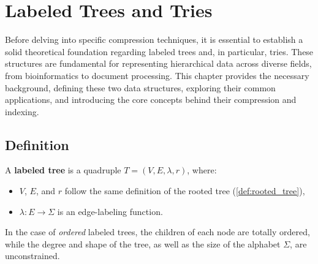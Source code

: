 \section{Labeled Trees and Tries} \label{chp:thbg_labeled_tree}
Before delving into specific compression techniques, it is essential to establish a solid theoretical foundation regarding labeled trees and, in particular, tries.
These structures are fundamental for representing hierarchical data across diverse fields, from bioinformatics to document processing.
This chapter provides the necessary background, defining these two data structures, exploring their common applications, and introducing the core concepts behind their compression and indexing. 

\subsection{Definition}
\begin{definition} \label{def:labeled_tree}
    A \textbf{labeled tree} is a quadruple $T = (V, E, \lambda, r)$, where:
    \begin{itemize}
        \item $V$, $E$, and $r$ follow the same definition of the rooted tree (\cref{def:rooted_tree}),
        \item $\lambda : E \to \Sigma$ is an edge-labeling function.
    \end{itemize}
\end{definition}
In the case of \emph{ordered} labeled trees, the children of each node are totally ordered, while the degree and shape of the tree, as well as the size of the alphabet $\Sigma$, are unconstrained.


